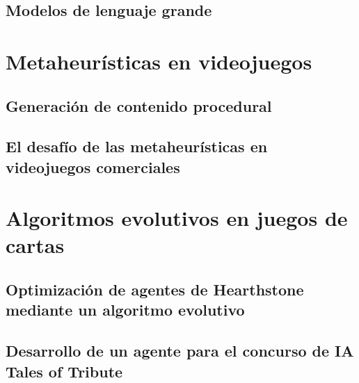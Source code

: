 
\subsection{Modelos de lenguaje grande}


\section{Metaheurísticas en videojuegos} \label{sec:estado_arte}
\subsection{Generación de contenido procedural}


\subsection{El desafío de las metaheurísticas en videojuegos comerciales}


\section{Algoritmos evolutivos en juegos de cartas} \label{sec:trabajos_relacionados}


\subsection{Optimización de agentes de Hearthstone mediante un algoritmo evolutivo}


\subsection{Desarrollo de un agente para el concurso de IA Tales of Tribute}
